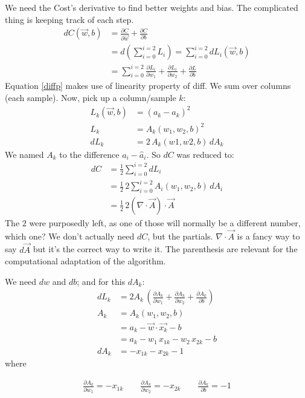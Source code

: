 We need the Cost's derivative to find better weights and bias. The complicated thing is keeping track of each step.
\begin{align}
  dC(\vec{w},b) &= \frac{\partial C}{\partial \vec{w}} + \frac{\partial C}{\partial b}\nonumber\\
  &= d(\sum_{i=0}^{i=2}L_i) = \sum_{i=0}^{i=2}dL_i(\vec{w},b) \label{diffp}\\
  &=\sum_{i=0}^{i=2} \frac{\partial L_i}{\partial w_1} +\frac{\partial L_i}{\partial w_2} + \frac{\partial L}{\partial b}\nonumber
\end{align}
Equation \ref{diffp} makes use of linearity property of diff. We sum over columns (each sample). Now, pick up a column/sample $k$:
\begin{align*}
  L_k(\vec{w},b) &= (a_k - \hat{a}_k)^2\\
    L_k &= A_k(w_1, w_2, b)^2\\
    dL_k &= 2\,A_k(w1,w2,b)\,dA_k
\end{align*}
We named $A_k$ to the difference $a_i-\hat{a}_i$.
So $dC$ was reduced to:
\begin{align}
  dC &= \frac{1}{2}\sum_{i=0}^{i=2} dL_i\\
  &= \frac{1}{2}\,{}2\sum_{i=0}^{i=2}A_i(w_1, w_2, b)\,dA_i\\
  &= \frac{1}{2}\,{}2(\nabla\cdot\vec{A})\cdot{}\vec{A}
\end{align}
The $2$ were purposedly left, as one of those will normally be a different number, which one? We don't actually need $dC$, but the partials.
$\nabla\cdot\vec{A}$ is a fancy way to say $d\vec{A}$ but it's the correct way to write it. The parenthesis are relevant for the computational adaptation of the algorithm.

We need $dw$ and $db$; and for this $dA_k$:
\begin{align*}
  dL_k  &= 2A_k\,(\frac{\partial A_k}{\partial w_1} + \frac{\partial A_k}{\partial w_2} + \frac{\partial A_k}{\partial b}) \\
  A_k &= A_k(w_1, w_2, b)\\
  &= a_k - \vec{w}\cdot{}\vec{x_k} - b\\
  &= a_k - w_1\,x_{1k} - w_2\,x_{2k}-b\\
  dA_k &= -x_{1k} - x_{2k} -1
\end{align*}
where 
\begin{center}
\begin{align*}
  \frac{\partial A_{k}}{\partial w_1} = -x_{1k}\hspace{2em} \frac{\partial A_{k}}{\partial w_2} = -x_{2k}\hspace{2em} \frac{\partial A_k}{\partial b} = -1
\end{align*} 
\end{center}

